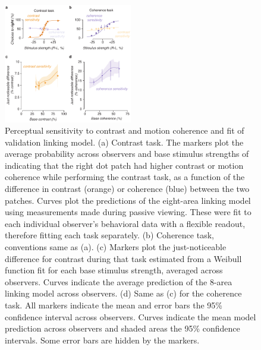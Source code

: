 \begin{figure}
\centering
\includegraphics[keepaspectratio,width=0.5\textwidth]{figs_c3/Fig2_behav.pdf}
\caption[Perceptual sensitivity to contrast and motion coherence and fit of validation linking model]{Perceptual sensitivity to contrast and motion coherence and fit of validation linking model. (a) Contrast task. The markers plot the average probability across observers and base stimulus strengths of indicating that the right dot patch had higher contrast or motion coherence while performing the contrast task, as a function of the difference in contrast (orange) or coherence (blue) between the two patches. Curves plot the predictions of the eight-area linking model using measurements made during passive viewing. These were fit to each individual observer’s behavioral data with a flexible readout, therefore fitting each task separately. (b) Coherence task, conventions same as (a). (c) Markers plot the just-noticeable difference for contrast during that task estimated from a Weibull function fit for each base stimulus strength, averaged across observers. Curves indicate the average prediction of the 8-area linking model across observers. (d) Same as (c) for the coherence task. All markers indicate the mean and error bars the 95\% confidence interval across observers. Curves indicate the mean model prediction across observers and shaded areas the 95\% confidence intervals. Some error bars are hidden by the markers.}
\label{fig:c3f2}
\end{figure}

